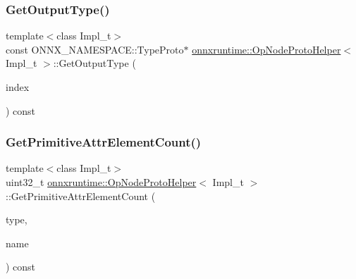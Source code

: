 \subsubsection{\texorpdfstring{Get\+Output\+Type()}{GetOutputType()}}
{\footnotesize\ttfamily template$<$class Impl\+\_\+t$>$ \\
const O\+N\+N\+X\+\_\+\+N\+A\+M\+E\+S\+P\+A\+C\+E\+::\+Type\+Proto$\ast$ \mbox{\hyperlink{classonnxruntime_1_1OpNodeProtoHelper}{onnxruntime\+::\+Op\+Node\+Proto\+Helper}}$<$ Impl\+\_\+t $>$\+::Get\+Output\+Type (\begin{DoxyParamCaption}\item[{\mbox{\hyperlink{mlasi_8h_a503efbc1c6e50825320ad909366b78ab}{size\+\_\+t}}}]{index }\end{DoxyParamCaption}) const\hspace{0.3cm}{\ttfamily [inline]}}

\mbox{\label{classonnxruntime_1_1OpNodeProtoHelper_ad077f2ec1f980aec98a792cfbcca4dfb}} 
\subsubsection{\texorpdfstring{Get\+Primitive\+Attr\+Element\+Count()}{GetPrimitiveAttrElementCount()}}
{\footnotesize\ttfamily template$<$class Impl\+\_\+t$>$ \\
uint32\+\_\+t \mbox{\hyperlink{classonnxruntime_1_1OpNodeProtoHelper}{onnxruntime\+::\+Op\+Node\+Proto\+Helper}}$<$ Impl\+\_\+t $>$\+::Get\+Primitive\+Attr\+Element\+Count (\begin{DoxyParamCaption}\item[{O\+N\+N\+X\+\_\+\+N\+A\+M\+E\+S\+P\+A\+C\+E\+::\+Attribute\+Proto\+\_\+\+Attribute\+Type}]{type,  }\item[{const std\+::string \&}]{name }\end{DoxyParamCaption}) const\hspace{0.3cm}{\ttfamily [noexcept]}}

\mbox{\label{classonnxruntime_1_1OpNodeProtoHelper_af4b6e9a3a48ac7edfe8beaecc765f8e4}} 
